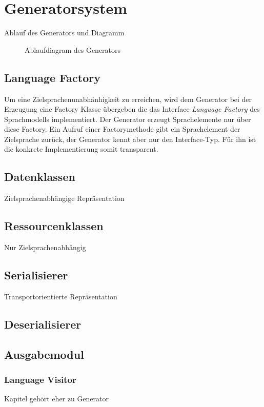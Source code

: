 \section{Generatorsystem}
\label{sec:generatorsystem}

Ablauf des Generators und Diagramm

\begin{sidewaysfigure}
    \centering
    \resizebox{0.9\textwidth}{!}{
        
    } 
    \caption{Ablaufdiagram des Generators}
    \label{fig:generation_process}
\end{sidewaysfigure}

\subsection{Language Factory}
\label{sec:language_factory}

Um eine Zielsprachenunabhänhigkeit zu erreichen, wird dem Generator bei der Erzeugung eine Factory Klasse übergeben die das Interface \emph{Language Factory} des Sprachmodells implementiert. Der Generator erzeugt Sprachelemente nur über diese Factory. Ein Aufruf einer Factorymethode gibt ein Sprachelement der Zielsprache zurück, der Generator kennt aber nur den Interface-Typ. Für ihn ist die konkrete Implementierung somit transparent.

\subsection{Datenklassen}
\label{sec:dataclasses}

Zielsprachenabhängige Repräsentation

\subsection{Ressourcenklassen}
\label{sec:ressourceclasses}

Nur Zielsprachenabhängig

\subsection{Serialisierer}
\label{sec:serialiser}

Transportorientierte Repräsentation

\subsection{Deserialisierer}
\label{sec:deserialiser}

\subsection{Ausgabemodul}
\label{sec:printer}

\subsubsection{Language Visitor}
\label{sec:language_visitor}

Kapitel gehört eher zu Generator
